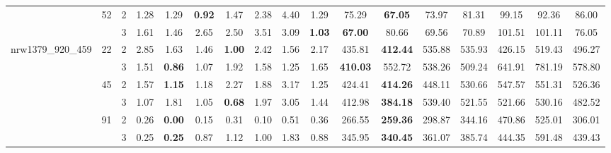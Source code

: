 \begin{tabular}{|ccc|ccccccc|ccccccc|}
    \cline{2-17}
    
        & \multirow[c]{2}{*}{52} & 2 & 1.28 & 1.29 & \bfseries 0.92 & 1.47 & 2.38 & 4.40 & 1.29 & 75.29 & \bfseries 67.05 & 73.97 & 81.31 & 99.15 & 92.36 & 86.00 \\
        &  & 3 & 1.61 & 1.46 & 2.65 & 2.50 & 3.51 & 3.09 & \bfseries 1.03 & \bfseries 67.00 & 80.66 & 69.56 & 70.89 & 101.51 & 101.11 & 76.05 \\
    
    \cline{1-17}
    \cline{2-17}
        \multirow[c]{6}{*}{nrw1379\_920\_459} & \multirow[c]{2}{*}{22} & 2 & 2.85 & 1.63 & 1.46 & \bfseries 1.00 & 2.42 & 1.56 & 2.17 & 435.81 & \bfseries 412.44 & 535.88 & 535.93 & 426.15 & 519.43 & 496.27 \\
        &  & 3 & 1.51 & \bfseries 0.86 & 1.07 & 1.92 & 1.58 & 1.25 & 1.65 & \bfseries 410.03 & 552.72 & 538.26 & 509.24 & 641.91 & 781.19 & 578.80 \\
    
    \cline{2-17}

        & \multirow[c]{2}{*}{45} & 2 & 1.57 & \bfseries 1.15 & 1.18 & 2.27 & 1.88 & 3.17 & 1.25 & 424.41 & \bfseries 414.26 & 448.11 & 530.66 & 547.57 & 551.31 & 526.36 \\
        &  & 3 & 1.07 & 1.81 & 1.05 & \bfseries 0.68 & 1.97 & 3.05 & 1.44 & 412.98 & \bfseries 384.18 & 539.40 & 521.55 & 521.66 & 530.16 & 482.52 \\
    
    \cline{2-17}

        & \multirow[c]{2}{*}{91} & 2 & 0.26 & \bfseries 0.00 & 0.15 & 0.31 & 0.10 & 0.51 & 0.36 & 266.55 & \bfseries 259.36 & 298.87 & 344.16 & 470.86 & 525.01 & 306.01 \\
        &  & 3 & 0.25 & \bfseries 0.25 & 0.87 & 1.12 & 1.00 & 1.83 & 0.88 & 345.95 & \bfseries 340.45 & 361.07 & 385.74 & 444.35 & 591.48 & 439.43 \\
    
    \bottomrule
\end{tabular}
